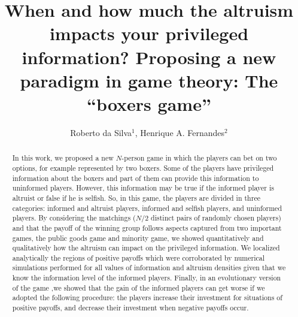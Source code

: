 \documentclass[3p, 11pt]{elsarticle}
\begin{document}

\begin{frontmatter}

\title{When and how much the altruism impacts your privileged information? Proposing a new paradigm in game theory: The \textquotedblleft boxers game\textquotedblright}

\author{Roberto da Silva$^{1}$, Henrique A. Fernandes$^{2}$}

\address{$^1$Instituto de F{\'i}sica, Universidade Federal do Rio Grande do Sul, Av. Bento Gon{\c{c}}alves, 9500 - CEP 91501-970, Porto Alegre, Rio Grande do Sul, Brazil\\
$^2$Instituto de Ci{\^e}ncias Exatas, Universidade Federal de Goi{\'a}s, Regional Jata{\'i}, BR 364, km 192, 3800 - CEP 75801-615, Jata{\'i}, Goi{\'a}s, Brazil}


\begin{abstract}

In this work, we proposed a new $N$-person game in which the players can bet on two options, for example
represented by two boxers. Some of the players have privileged information about the boxers and part of them 
can provide this information to uninformed players. However, this information may be true if the informed player 
is altruist or false if he is selfish. So, in this game, the players are divided in three categories: informed and 
altruist players, informed and selfish players, and uninformed players. By considering the matchings 
($N/2$ distinct pairs of randomly chosen players) and that the payoff of the winning group follows
aspects captured from two important games, the public goods game and minority game, we showed quantitatively 
and qualitatively how the altruism can impact on the privileged information. We localized analytically the regions 
of positive payoffs which were corroborated by numerical simulations performed for all values of information and 
altruism densities given that we know the information level of the informed players. Finally, in an evolutionary version 
of the game ,we showed that the gain of the informed players can get worse if we adopted the following procedure: the 
players increase their investment for situations of positive payoffs, and decrease their investment when negative payoffs 
occur.

\end{abstract}

\end{frontmatter}

\setlength{\baselineskip}{0.7cm}
\end{document}
